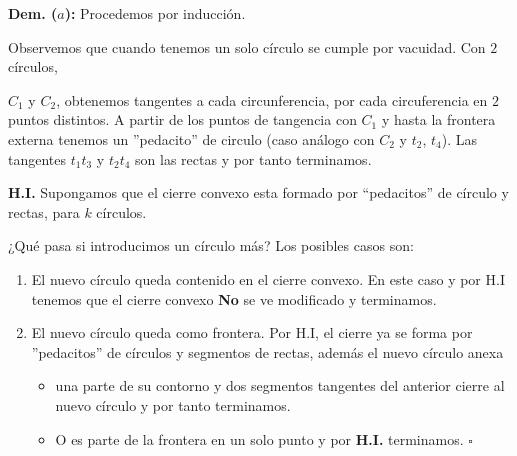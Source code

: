 \textbf{Dem. ($a$):} 
Procedemos por inducción.

Observemos que cuando tenemos un solo círculo se cumple por vacuidad. Con $2$ círculos,
  \begin{figure}[ht!]
    \centering
  \end{figure}

$C_1$ y $C_2$, obtenemos
tangentes a cada circunferencia, por cada circuferencia en $2$ puntos distintos. A partir de los puntos de
tangencia con $C_1$ y hasta la frontera externa tenemos un ''pedacito'' de circulo (caso análogo con $C_2$ y
$t_2$, $t_4$). Las tangentes $t_1t_3$ y $t_2t_4$ son las rectas y por tanto terminamos. \newline

\textbf{H.I.} Supongamos que el cierre convexo esta formado por ``pedacitos'' de círculo y rectas, para $k$ círculos. \newline

¿Qué pasa si introducimos un círculo más? Los posibles casos son:
\begin{enumerate}
    \item El nuevo círculo queda contenido en el cierre convexo. En este caso y por H.I tenemos que
    el cierre convexo \textbf{No} se ve modificado y terminamos.
    \item El nuevo círculo queda como frontera. Por H.I, el cierre ya se forma por ''pedacitos''
    de círculos y segmentos de rectas, además el nuevo círculo anexa
    \begin{itemize}
        \item una parte de su contorno y dos segmentos tangentes del anterior cierre al nuevo círculo y por tanto terminamos.
        \item O es parte de la frontera en un solo punto y por \textbf{H.I.} terminamos. \hfill$\square$
    \end{itemize}
\end{enumerate}
